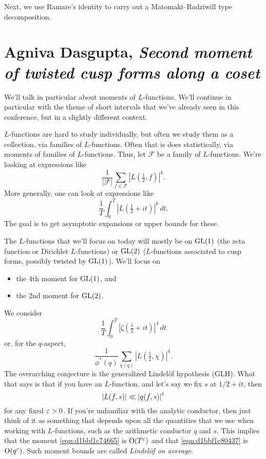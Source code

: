 \documentclass[reqno]{amsart} 
\begin{document}
Next, we use Ramare's identity to carry out a Matomaki--Radziwill type decomposition.



\section{Agniva Dasgupta, \emph{Second moment of twisted cusp forms along a coset}}

We'll talk in particular about moments of $L$-functions.  We'll continue in particular with the theme of short intervals that we've already seen in this conference, but in a slightly different context.

$L$-functions are hard to study individually, but often we study them as a collection, via families of $L$-functions.  Often that is does statistically, via moments of families of $L$-functions.  Thus, let $\mathcal{F}$ be a family of $L$-functions.  We're looking at expressions like
\begin{equation*}
  \frac{1}{\lvert \mathcal{F}  \rvert}
  \sum_{f \in \mathcal{F} }
  \left\lvert   L (\tfrac{1}{2} , f) \right\rvert^k.
\end{equation*}
More generally, one can look at expressions like
\begin{equation*}
  \frac{1}{T} \int_0^T
  \left\lvert L (\tfrac{1}{2} + i t ) \right\rvert^k \, d t.
\end{equation*}
The goal is to get asymptotic expansions or upper bounds for these.

The $L$-functions that we'll focus on today will mostly be on $\operatorname{GL}(1)$ (the zeta function or Dirichlet $L$-functions) or $\operatorname{GL}(2)$ ($L$-functions associated to cusp forms, possibly twisted by $\operatorname{GL}(1)$).  We'll focus on
\begin{itemize}
\item the $4$th moment for $\operatorname{GL}(1)$, and
\item the $2$nd moment for $\operatorname{GL}(2)$.
\end{itemize}
We consider
\begin{equation}\label{eqn:d1bbf1c74665}
  \frac{1}{T}
  \int_0^T \left\lvert \zeta (\tfrac{1}{2} + i t) \right\rvert^4 \, d t
\end{equation}
or, for the $q$-aspect,
\begin{equation}\label{eqn:d1bbf1c80437}
  \frac{1}{ \phi^\ast (q)}
  \sum_{\chi(q)}
  \left\lvert   L (\tfrac{1}{2}, \chi )  \right\rvert^4.
\end{equation}
The overarching conjecture is the generalized Lindel\"{o}f hypothesis (GLH).  What that says is that if you have an $L$-function, and let's say we fix $s$ at $1/2 + i t$, then
\begin{equation*}
  \left\lvert L (f, s) \right\rvert \ll \left\lvert q (f, s ) \right\rvert^\varepsilon 
\end{equation*}
for any fixed $\varepsilon > 0$.  If you're unfamiliar with the analytic conductor, then just think of it as something that depends upon all the quantities that we use when working with $L$-functions, such as the arithmetic conductor $q$ and $s$.  This implies that the moment \eqref{eqn:d1bbf1c74665} is $\operatorname{O}(T^{\varepsilon})$ and that \eqref{eqn:d1bbf1c80437} is $\operatorname{O}(q^\varepsilon)$.  Such moment bounds are called \emph{Lindel\"{o}f on average}.
\end{document}
